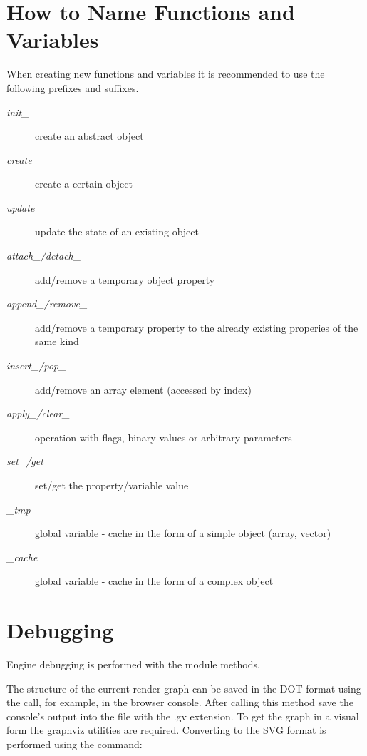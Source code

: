 \documentclass[a4paper,12pt,oneside]{sphinxmanual}
\begin{document}
\section{How to Name Functions and Variables}
\label{developers_advanced:id6}
When creating new functions and variables it is recommended to use the following prefixes and suffixes.
\begin{description}
\item[{\emph{init\_}}] \leavevmode
create an abstract object

\item[{\emph{create\_}}] \leavevmode
create a certain object

\item[{\emph{update\_}}] \leavevmode
update the state of an existing object

\item[{\emph{attach\_/detach\_}}] \leavevmode
add/remove a temporary object property

\item[{\emph{append\_/remove\_}}] \leavevmode
add/remove a temporary property to the already existing properies of the same kind

\item[{\emph{insert\_/pop\_}}] \leavevmode
add/remove an array element (accessed by index)

\item[{\emph{apply\_/clear\_}}] \leavevmode
operation with flags, binary values or arbitrary parameters

\item[{\emph{set\_/get\_}}] \leavevmode
set/get the property/variable value

\item[{\emph{\_tmp}}] \leavevmode
global variable - cache in the form of a simple object (array, vector)

\item[{\emph{\_cache}}] \leavevmode
global variable - cache in the form of a complex object

\end{description}


\section{Debugging}
\label{developers_advanced:debugging}\label{developers_advanced:id7}
Engine debugging is performed with the  module methods.

The structure of the current render graph can be saved in the DOT format using the  call, for example, in the browser console. After calling this method save the console's output into the file with the .gv extension. To get the graph in a visual form the \href{http://www.graphviz.org/}{graphviz} utilities are required. Converting to the SVG format is performed using the command:
\end{document}

